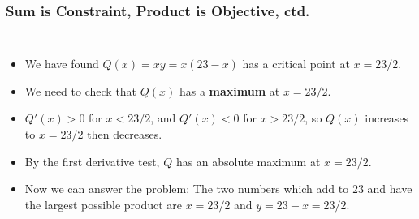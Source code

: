 \documentclass[serif,ignorenonframetext]{beamer}
\begin{document}
\begin{frame}
  \frametitle{Sum is Constraint, Product is Objective, ctd.}
  \begin{columns}
  \begin{itemize}[<+->]
  \item We have found $Q(x)=xy=x(23-x)$ has a critical point at $x=23/2$.
  \item We need to check that $Q(x)$ has a \textbf{maximum} at $x=23/2$.
  \item $Q'(x)>0$ for $x<23/2$,
    and $Q'(x)<0$ for $x>23/2$, so $Q(x)$ increases to $x=23/2$ 
    then decreases.
  \item By the first derivative test, $Q$ has an absolute maximum at
    $x=23/2$.
  \item Now we can answer the problem: The two numbers which add to 
    $23$ and have the largest possible product are $x=23/2$ and $y=23-x
    =23/2$.
  \end{itemize}
  \end{columns}
\end{frame}
\end{document}
